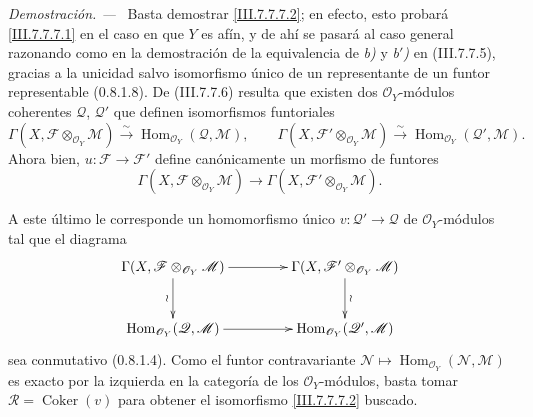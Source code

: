 \documentclass[10pt,oneside]{book}
\newcommand{\sref}[2][]{\textup{(#2)}}
\newcommand{\oldpage}[2][]{\setcounter{footnote}{0}\marginpar{\scriptsize\textbf{#1}~|~#2}\ignorespaces}
\newenvironment{proof}{\par\medskip\noindent\textit{Demostración. ---\ }}{\par}
\begin{document}
\begin{proof}
Basta demostrar \eqref{III.7.7.7.2}; en efecto, esto probará
\eqref{III.7.7.7.1} en el caso en que $Y$ es afín, y de ahí se pasará al caso
general razonando como en la demostración de la equivalencia de \emph{b)} y \emph{b$'$)} en
\sref{III.7.7.5}, gracias a la unicidad salvo isomorfismo único de un
representante de un funtor representable \sref[0]{0.8.1.8}. De
\sref{III.7.7.6} resulta que existen dos $\mathscr O_Y$-módulos coherentes
$\mathscr Q$, $\mathscr Q'$ que definen isomorfismos funtoriales
\[
  \Gamma(X,\mathscr F\otimes_{\mathscr O_Y}\mathscr M)
  \xrightarrow{\sim}
  \operatorname{Hom}_{\mathscr O_Y}(\mathscr Q,\mathscr M),
  \qquad
  \Gamma(X,\mathscr F'\otimes_{\mathscr O_Y}\mathscr M)
  \xrightarrow{\sim}
  \operatorname{Hom}_{\mathscr O_Y}(\mathscr Q',\mathscr M).
\]
Ahora bien, $u:\mathscr F\to\mathscr F'$ define canónicamente un morfismo de
funtores
\[
  \Gamma(X,\mathscr F\otimes_{\mathscr O_Y}\mathscr M)
  \longrightarrow
  \Gamma(X,\mathscr F'\otimes_{\mathscr O_Y}\mathscr M).
\]

\oldpage[III]{202}
A este último le corresponde un homomorfismo único
$v:\mathscr Q'\to\mathscr Q$ de $\mathscr O_Y$-módulos tal que el diagrama
\[
\xymatrix@C=42pt@R=28pt{
  \Gamma(X,\mathscr F\otimes_{\mathscr O_Y}\mathscr M)
    \ar[r]\ar[d]_-{\wr}
  &
  \Gamma(X,\mathscr F'\otimes_{\mathscr O_Y}\mathscr M)
    \ar[d]^-{\wr}
  \\
  \operatorname{Hom}_{\mathscr O_Y}(\mathscr Q,\mathscr M)
    \ar[r]
  &
  \operatorname{Hom}_{\mathscr O_Y}(\mathscr Q',\mathscr M)
}
\]
sea conmutativo \sref[0]{0.8.1.4}. Como el funtor contravariante
$\mathscr N\mapsto
\operatorname{Hom}_{\mathscr O_Y}(\mathscr N,\mathscr M)$ es exacto por la
izquierda en la categoría de los $\mathscr O_Y$-módulos, basta tomar
$\mathscr R=\operatorname{Coker}(v)$ para obtener el isomorfismo
\eqref{III.7.7.7.2} buscado.
\end{proof}
\end{document}
